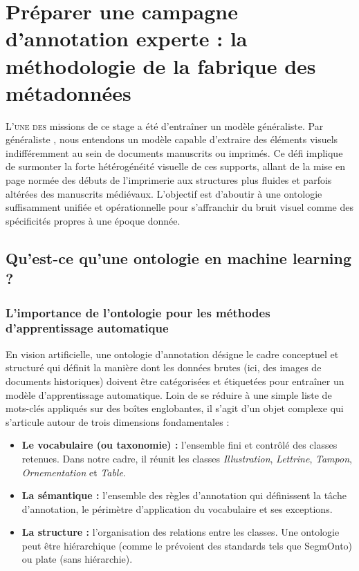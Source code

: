 \chapter[Préparer une campagne d’annotation]{Préparer une campagne d’annotation experte : la méthodologie de la fabrique des métadonnées}

\lettrine{L}{'une des} missions de ce stage a été d'entraîner un modèle généraliste. Par \og généraliste \fg, nous entendons un modèle capable d'extraire des éléments visuels indifféremment au sein de documents manuscrits ou imprimés. Ce défi implique de surmonter la forte hétérogénéité visuelle de ces supports, allant de la mise en page normée des débuts de l'imprimerie aux structures plus fluides et parfois altérées des manuscrits médiévaux. L'objectif est d'aboutir à une ontologie suffisamment unifiée et opérationnelle pour s'affranchir du bruit visuel comme des spécificités propres à une époque donnée.

\section[L'ontologie en machine learning]{Qu'est-ce qu'une ontologie en machine learning ?}

\subsection{L'importance de l'ontologie pour les méthodes d'apprentissage automatique}

En vision artificielle, une ontologie d'annotation désigne le cadre conceptuel et structuré qui définit la manière dont les données brutes (ici, des images de documents historiques) doivent être catégorisées et étiquetées pour entraîner un modèle d'apprentissage automatique. Loin de se réduire à une simple liste de mots-clés appliqués sur des boîtes englobantes, il s'agit d'un objet complexe qui s'articule autour de trois dimensions fondamentales :

\begin{itemize}
	\item \textbf{Le vocabulaire (ou taxonomie) :} l'ensemble fini et contrôlé des classes retenues. Dans notre cadre, il réunit les classes \textit{Illustration}, \textit{Lettrine}, \textit{Tampon}, \textit{Ornementation} et \textit{Table}.
	
	\item \textbf{La sémantique :} l'ensemble des règles d'annotation qui définissent la tâche d'annotation, le périmètre d'application du vocabulaire et ses exceptions.
	
	\item \textbf{La structure :} l'organisation des relations entre les classes. Une ontologie peut être hiérarchique (comme le prévoient des standards tels que SegmOnto) ou plate (sans hiérarchie).
\end{itemize}

